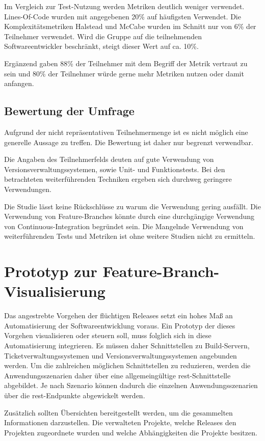 Im Vergleich zur Test-Nutzung werden Metriken deutlich weniger verwendet. Lines-Of-Code wurden mit angegebenen 20\% auf häufigsten Verwendet. Die Komplexitätsmetriken Halstead und McCabe wurden im Schnitt nur von 6\% der Teilnehmer verwendet. Wird die Gruppe auf die teilnehmenden Softwareentwickler beschränkt, steigt dieser Wert auf ca. 10\%.

Ergänzend gaben 88\% der Teilnehmer mit dem Begriff der Metrik vertraut zu sein und 80\% der Teilnehmer würde gerne mehr Metriken nutzen oder damit anfangen.

\subsection{Bewertung der Umfrage}

Aufgrund der nicht repräsentativen Teilnehmermenge ist es nicht möglich eine generelle Aussage zu treffen. Die Bewertung ist daher nur begrenzt verwendbar.

Die Angaben des Teilnehmerfelds deuten auf gute Verwendung von Versionsverwaltungssystemen, sowie Unit- und Funktionstests. Bei den betrachteten weiterführenden Techniken ergeben sich durchweg geringere Verwendungen.

Die Studie lässt keine Rückschlüsse zu warum die Verwendung gering ausfällt. Die Verwendung von Feature-Branches könnte durch eine durchgängige Verwendung von Continuous-Integration begründet sein. Die Mangelnde Verwendung von weiterführenden Tests und Metriken ist ohne weitere Studien nicht zu ermitteln.

\section{Prototyp zur Feature-Branch-Visualisierung}

Das angestrebte Vorgehen der \glqq flüchtigen\grqq{} Releases setzt ein hohes Maß an Automatisierung der Softwareentwicklung voraus. Ein Prototyp der dieses Vorgehen visualisieren oder steuern soll, muss folglich sich in diese Automatisierung integrieren. Es müssen daher Schnittstellen zu Build-Servern, Ticketverwaltungssystemen und Versionsverwaltungssystemen angebunden werden. Um die zahlreichen möglichen Schnittstellen zu reduzieren, werden die Anwendungsszenarien daher über eine allgemeingültige \acs{rest}-Schnittstelle abgebildet. Je nach Szenario können dadurch die einzelnen Anwendungsszenarien über die \acs{rest}-Endpunkte abgewickelt werden.

Zusätzlich sollten Übersichten bereitgestellt werden, um die gesammelten Informationen darzustellen. Die verwalteten Projekte, welche Releases den Projekten zugeordnete wurden und welche Abhängigkeiten die Projekte besitzen. 

